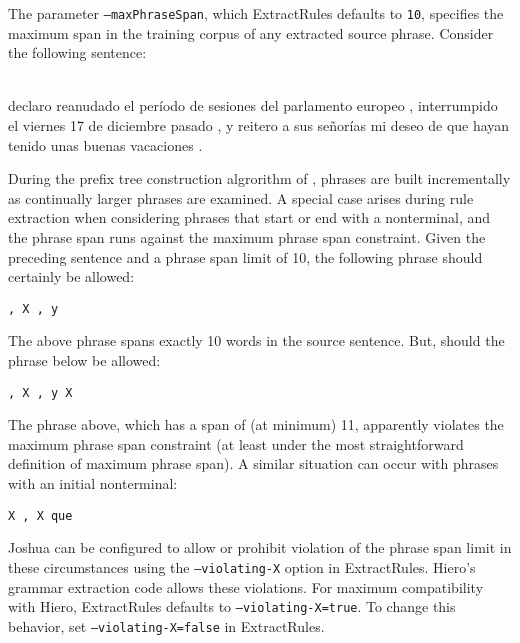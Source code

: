 The parameter {\tt --maxPhraseSpan}, which ExtractRules defaults to {\tt 10}, specifies the maximum span in the training corpus of any extracted source phrase. Consider the following sentence:

\begin{tt}
\ \\
declaro reanudado el per\'iodo de sesiones del parlamento europeo , interrumpido el viernes 17 de diciembre pasado , y reitero a sus se\~nor\'ias mi deseo de que hayan tenido unas buenas vacaciones .
\ \\
\end{tt}

During the prefix tree construction algrorithm of , phrases are built incrementally as continually larger phrases are examined.  A special case arises during rule extraction when considering phrases that start or end with a nonterminal, and the phrase span runs against the maximum phrase span constraint.  Given the preceding sentence and a phrase span limit of 10, the following phrase should certainly be allowed:

\begin{verbatim}
, X , y
\end{verbatim}

The above phrase spans exactly 10 words in the source sentence. But, should the phrase below be allowed:

\begin{verbatim}
, X , y X
\end{verbatim}

The phrase above, which has a span of (at minimum) 11, apparently violates the maximum phrase span constraint (at least under the most straightforward definition of maximum phrase span). A similar situation can occur with phrases with an initial nonterminal:

\begin{verbatim}
X , X que
\end{verbatim}

Joshua can be configured to allow or prohibit violation of the phrase span limit in these circumstances using the {\tt --violating-X} option in ExtractRules. Hiero's grammar extraction code allows these violations. For maximum compatibility with Hiero, ExtractRules defaults to {\tt --violating-X=true}. To change this behavior, set {\tt --violating-X=false} in ExtractRules.


